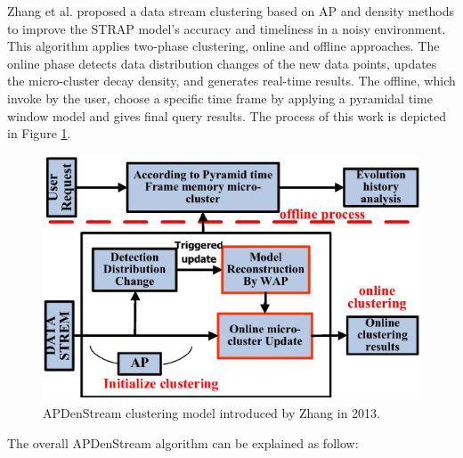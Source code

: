Zhang et al. \cite{zhang2013online} proposed a data stream clustering based on AP and density methods to improve the STRAP model's accuracy and timeliness in a noisy environment. This algorithm applies two-phase clustering, online and offline approaches. The online phase detects data distribution changes of the new data points, updates the micro-cluster decay density, and generates real-time results. The offline, which invoke by the user, choose a specific time frame by applying a pyramidal time window model and gives final query results. The process of this work is depicted in Figure \ref{APden}. 


\begin{figure}[h]
\centering
\includegraphics[width = 10 cm]{image/Chapters/Chapter3/APDenstream.PNG}
\caption{APDenStream clustering model introduced by Zhang in 2013. }
\label{APden}
\end{figure}


The overall APDenStream algorithm can be explained as follow:

